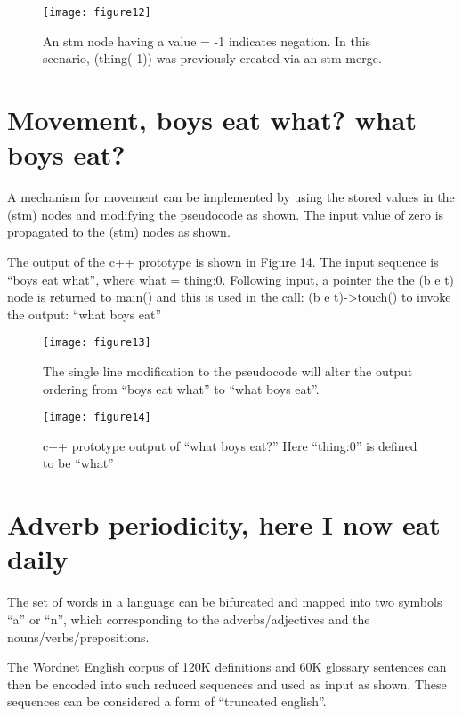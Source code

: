 \documentclass{clv3}
\begin{document}
 \begin{figure}
\texttt{[image: figure12]}
\caption{An stm node having a value = -1 indicates negation.  In this scenario, (thing(-1)) was previously created via an stm merge.}
\end{figure}


 

\section{Movement, boys eat what?   what boys eat?}


A mechanism for movement can be implemented by using the stored values in the (stm) nodes and modifying the pseudocode as shown.  The input value of zero is propagated to the  (stm) nodes as shown.

The output of the c++ prototype is shown in Figure 14.  The input sequence is ``boys eat what'', where what = thing:0.  Following input, a pointer the the (b e t) node is returned to main() and this is used in the  call: (b e t)->touch() to invoke the output: ``what boys eat'' 

 \begin{figure}[H]
\texttt{[image: figure13]}
\caption{The single line modification to the pseudocode  will alter the output ordering from “boys eat what”  to “what boys eat”.}
\end{figure}

\begin{figure}[H]
\texttt{[image: figure14]}
\caption{c++ prototype output of “what boys eat?”  Here “thing:0” is defined to be “what”}
\end{figure}








\section{Adverb periodicity, here I now eat daily}


The set of words in a language can be bifurcated and mapped into two symbols ``a'' or ``n'', which corresponding to the adverbs/adjectives and the nouns/verbs/prepositions.

The Wordnet English corpus of 120K definitions and 60K glossary sentences can then be encoded into such reduced sequences and used as input as shown.   These sequences can be considered a form of ``truncated english''.
\end{document}

